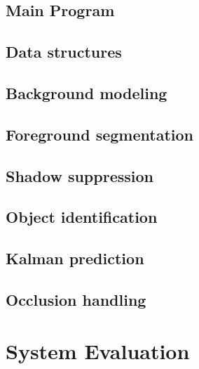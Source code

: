 \documentclass[10pt, a4paper, twoside]{article}
\numberwithin{equation}{subsection}
\numberwithin{figure}{section}
\numberwithin{table}{section}
\begin{document}
\newpage
\subsection{Main Program}


\newpage
\subsection{Data structures}


\newpage
\subsection{Background modeling}


\newpage
\subsection{Foreground segmentation}


\newpage
\subsection{Shadow suppression}


\newpage
\subsection{Object identification}


\newpage
\subsection{Kalman prediction}


\newpage
\subsection{Occlusion handling}
\label{sec:Occlusion}


\newpage
\section{System Evaluation}
\label{sec:evaluation}


\newpage
\end{document}
